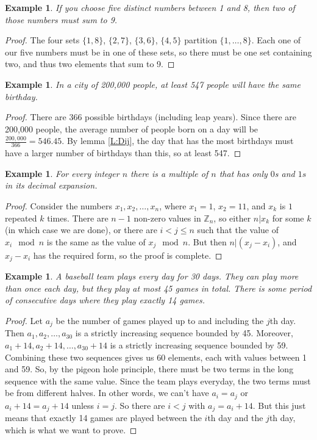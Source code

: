 \documentclass{article}
\theoremstyle{plain}
\newtheorem{example}[theorem]{Example}{\bfseries}{\upshape}
\newcommand{\bZ}{\mathbb{Z}}
\begin{document}
\begin{example}
If you choose five distinct numbers between 1 and 8, then two of those numbers must sum to 9.
\end{example}
\begin{proof}
The four sets $\{1,8\}$, $\{2,7\}$, $\{3,6\}$, $\{4,5\}$ partition $\{1,\ldots,8\}$. Each one of our five numbers must be in one of these sets, so there must be one set containing two, and thus two elements that sum to 9.
\end{proof}

\begin{example}
In a city of 200,000 people, at least 547 people will have the same birthday. 
\end{example}
\begin{proof}
There are 366 possible birthdays (including leap years). Since there are 200,000 people, the average number of people born on a day will be $\frac{200,000}{366}= 546.45$. By lemma \ref{L:Dij}, the day that has the most birthdays must have a larger number of birthdays than this, so at least 547.
\end{proof}

\begin{example}
For every integer $n$ there is a multiple of $n$ that has only $0$s and $1s$ in its decimal expansion.
\end{example}
\begin{proof}
Consider the numbers $x_1,x_2,\ldots,x_{n}$, where $x_1=1$, $x_2=11$, and $x_k$ is $1$ repeated $k$ times. There are $n-1$ non-zero values in $\bZ_n$, so either $n|x_k$ for some $k$ (in which case we are done), or there are $i<j\leq n$ such that the value of $x_i \mod n$ is the same as the value of $x_j \mod n$. But then $n|(x_j-x_i)$, and $x_j-x_i$ has the required form, so the proof is complete.
\end{proof}

\begin{example}
A baseball team plays every day for 30 days. They can play more than once each day, but they play at most 45 games in total. There is some period of consecutive days where they play exactly 14 games.
\end{example}
\begin{proof}
Let $a_j$ be the number of games played up to and including the $j$th day. Then $a_1,a_2,\ldots,a_{30}$ is a strictly increasing sequence bounded by 45. Moreover, $a_1 + 14,a_2+14,\ldots, a_{30}+14$ is a strictly increasing sequence bounded by 59. Combining these two sequences gives us 60 elements, each with values between 1 and 59. So, by the pigeon hole principle, there must be two terms in the long sequence with the same value. Since the team plays everyday, the two terms must be from different halves. In other words, we can't have $a_i = a_j$ or $a_i+14 = a_j +14$ unless $i=j$. So there are $i < j$ with $a_j=a_i+14$. But this just means that exactly 14 games are played between the $i$th day and the $j$th day, which is what we want to prove. 
\end{proof}
\end{document}
